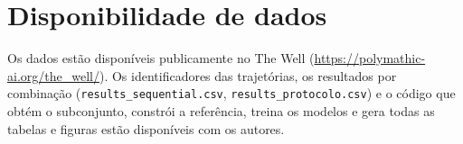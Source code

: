 \documentclass[final,5p,times,twocolumn]{elsarticle}
\begin{document}
\section*{Disponibilidade de dados}
Os dados estão disponíveis publicamente no The Well (\url{https://polymathic-ai.org/the_well/}). Os identificadores das trajetórias, os resultados por combinação (\texttt{results\_sequential.csv}, \texttt{results\_protocolo.csv}) e o código que obtém o subconjunto, constrói a referência, treina os modelos e gera todas as tabelas e figuras estão disponíveis com os autores.

\setlength{\bibsep}{1pt plus 0.5pt}
\renewcommand{\bibfont}{\footnotesize}


\end{document}
